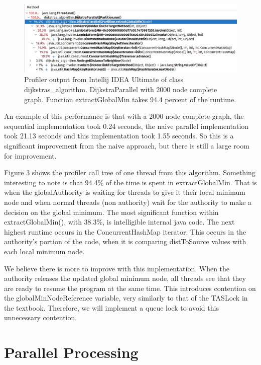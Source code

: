 \documentclass[letterpaper, 10 pt, conference]{ieeeconf}  %
\begin{document}
\begin{figure}
\centering
\includegraphics[width=.4\textwidth]{extractGlobalMin.png}
\caption{Profiler output from Intellij IDEA Ultimate of class dijkstras\_algorithm. DijkstraParallel with 2000 node complete graph. Function extractGlobalMin takes 94.4 percent of the runtime.}
\end{figure}

An example of this performance is that with a 2000 node complete graph, the sequential implementation took 0.24 seconds, the naive parallel implementation took 21.13 seconds and this implementation took 1.55 seconds. So this is a significant improvement from the naive approach, but there is still a large room for improvement.

Figure 3 shows the profiler call tree of one thread from this algorithm. Something interesting to note is that 94.4\% of the time is spent in extractGlobalMin. That is when the globalAuthority is waiting for threads to give it their local minimum node and when normal threads (non authority) wait for the authority to make a decision on the global minimum. 
The most significant function within extractGlobalMin(), with 38.3\%, is intelligible internal java code. The next highest runtime occurs in the ConcurrentHashMap iterator. This occurs in the authority’s portion of the code, when it is comparing distToSource values with each local minimum node. 

We believe there is more to improve with this implementation. When the authority releases the updated global minimum node, all threads see that they are ready to resume the program at the same time. This introduces contention on the globalMinNodeReference variable, very similarly to that of the TASLock in the textbook. Therefore, we will implement a queue lock to avoid this unnecessary contention. 

\section{Parallel Processing}



\end{document}
